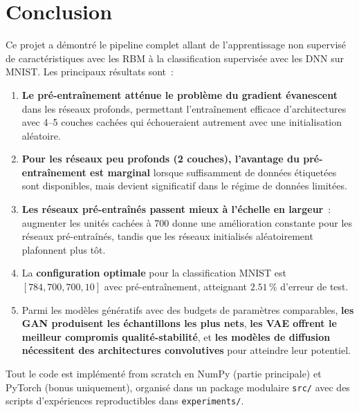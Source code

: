 \documentclass[11pt,a4paper]{article}
\renewcommand{\texttt}[1]{\urlstyle{tt}\nolinkurl{#1}}
\begin{document}
\section{Conclusion}

Ce projet a d\'emontr\'e le pipeline complet allant de l'apprentissage non supervis\'e de caract\'eristiques avec les RBM \`a la classification supervis\'ee avec les DNN sur MNIST. Les principaux r\'esultats sont~:

\begin{enumerate}
    \item \textbf{Le pr\'e-entra\^inement att\'enue le probl\`eme du gradient \'evanescent}~\cite{erhan2010} dans les r\'eseaux profonds, permettant l'entra\^inement efficace d'architectures avec 4--5 couches cach\'ees qui \'echoueraient autrement avec une initialisation al\'eatoire.
    \item \textbf{Pour les r\'eseaux peu profonds (2 couches), l'avantage du pr\'e-entra\^inement est marginal} lorsque suffisamment de donn\'ees \'etiquet\'ees sont disponibles, mais devient significatif dans le r\'egime de donn\'ees limit\'ees.
    \item \textbf{Les r\'eseaux pr\'e-entra\^in\'es passent mieux \`a l'\'echelle en largeur}~: augmenter les unit\'es cach\'ees \`a 700 donne une am\'elioration constante pour les r\'eseaux pr\'e-entra\^in\'es, tandis que les r\'eseaux initialis\'es al\'eatoirement plafonnent plus t\^ot.
    \item La \textbf{configuration optimale} pour la classification MNIST est $[784, 700, 700, 10]$ avec pr\'e-entra\^inement, atteignant $2.51\,\%$ d'erreur de test.
    \item Parmi les mod\`eles g\'en\'eratifs avec des budgets de param\`etres comparables, \textbf{les GAN produisent les \'echantillons les plus nets}, \textbf{les VAE offrent le meilleur compromis qualit\'e-stabilit\'e}, et \textbf{les mod\`eles de diffusion n\'ecessitent des architectures convolutives} pour atteindre leur potentiel.
\end{enumerate}

Tout le code est impl\'ement\'e from scratch en NumPy (partie principale) et PyTorch (bonus uniquement), organis\'e dans un package modulaire \texttt{src/} avec des scripts d'exp\'eriences reproductibles dans \texttt{experiments/}.
\end{document}
